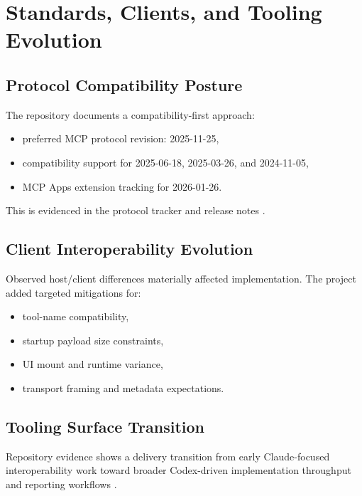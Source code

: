 \chapter{Standards, Clients, and Tooling Evolution}
\label{ch:standards}

\section{Protocol Compatibility Posture}

The repository documents a compatibility-first approach:
\begin{itemize}
  \item preferred MCP protocol revision: 2025-11-25,
  \item compatibility support for 2025-06-18, 2025-03-26, and 2024-11-05,
  \item MCP Apps extension tracking for 2026-01-26.
\end{itemize}

This is evidenced in the protocol tracker and release notes
\cite{spec_tracking,release_0212}.

\section{Client Interoperability Evolution}

Observed host/client differences materially affected implementation. The project
added targeted mitigations for:
\begin{itemize}
  \item tool-name compatibility,
  \item startup payload size constraints,
  \item UI mount and runtime variance,
  \item transport framing and metadata expectations.
\end{itemize}

\section{Tooling Surface Transition}

Repository evidence shows a delivery transition from early Claude-focused
interoperability work toward broader Codex-driven implementation throughput and
reporting workflows \cite{progress_tracker,context_tracker,codex_long_horizon_20260304}.
